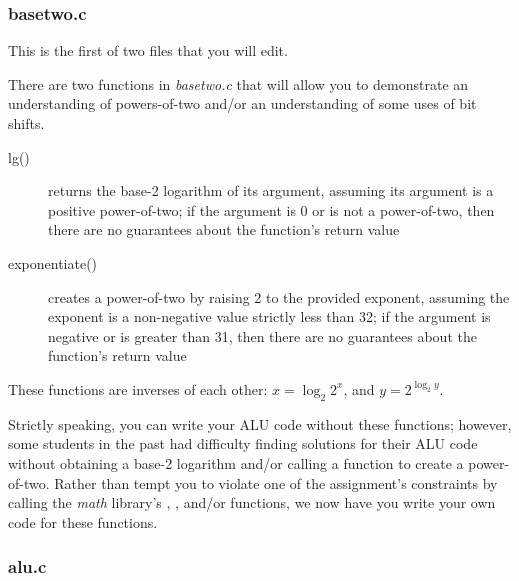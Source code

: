 \subsubsection{basetwo.c}

This is the first of two files that you will edit.

There are two functions in \textit{basetwo.c} that will allow you to demonstrate an understanding of powers-of-two and/or an understanding of some uses of bit shifts.
\begin{description}
    \item[lg()] returns the base-2 logarithm of its argument, assuming its argument is a positive power-of-two;
        if the argument is 0 or is not a power-of-two, then there are no guarantees about the function's return value
    \item[exponentiate()] creates a power-of-two by raising 2 to the provided exponent, assuming the exponent is a non-negative value strictly less than 32;
        if the argument is negative or is greater than 31, then there are no guarantees about the function's return value
\end{description}
These functions are inverses of each other: $x = \log_2 2^x$, and $y = 2^{\log_2 y}$.

Strictly speaking, you can write your ALU code without these functions;
however, some students in the past had difficulty finding solutions for their ALU code without obtaining a base-2 logarithm and/or calling a function to create a power-of-two.
Rather than tempt you to violate one of the assignment's constraints by calling the \textit{math} library's , , and/or  functions, we now have you write your own code for these functions.

\subsubsection{alu.c}

